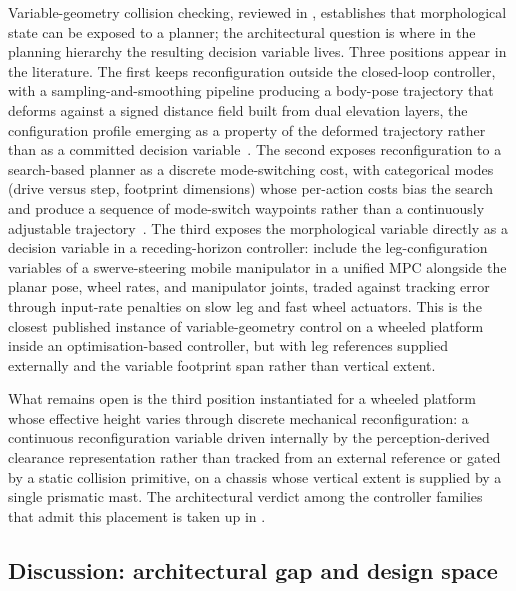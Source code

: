\documentclass[11pt,a4paper]{article}
\begin{document}
Variable-geometry collision checking, reviewed in , establishes that morphological state can be exposed to a planner; the architectural question is where in the planning hierarchy the resulting decision variable lives. Three positions appear in the literature. The first keeps reconfiguration outside the closed-loop controller, with a sampling-and-smoothing pipeline producing a body-pose trajectory that deforms against a signed distance field built from dual elevation layers, the configuration profile emerging as a property of the deformed trajectory rather than as a committed decision variable~\cite{buchananWalkingPostureAdaptation2019,PerceptiveWholebodyPlanning}. The second exposes reconfiguration to a search-based planner as a discrete mode-switching cost, with categorical modes (drive versus step, footprint dimensions) whose per-action costs bias the search and produce a sequence of mode-switch waypoints rather than a continuously adjustable trajectory~\cite{klamtPlanningHybridDrivingStepping2018,raghavanAgileLeggedWheeledReconfigurable2020}. The third exposes the morphological variable directly as a decision variable in a receding-horizon controller: \citet{pankertDesignMotionPlanning2022} include the leg-configuration variables of a swerve-steering mobile manipulator in a unified MPC alongside the planar pose, wheel rates, and manipulator joints, traded against tracking error through input-rate penalties on slow leg and fast wheel actuators. This is the closest published instance of variable-geometry control on a wheeled platform inside an optimisation-based controller, but with leg references supplied externally and the variable footprint span rather than vertical extent.

What remains open is the third position instantiated for a wheeled platform whose effective height varies through discrete mechanical reconfiguration: a continuous reconfiguration variable driven internally by the perception-derived clearance representation rather than tracked from an external reference or gated by a static collision primitive, on a chassis whose vertical extent is supplied by a single prismatic mast. The architectural verdict among the controller families that admit this placement is taken up in .

\subsection{Discussion: architectural gap and design space}
\label{sec:sq4:discussion}
\end{document}
